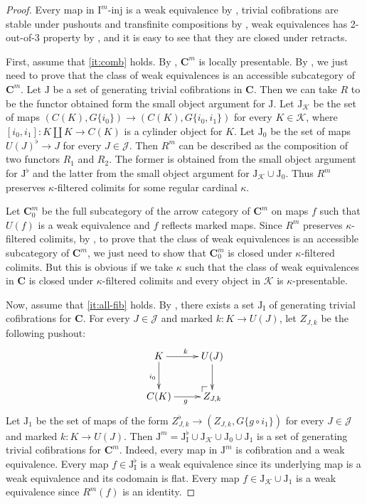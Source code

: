 \documentclass[reqno]{amsart}
\makeatletter
\theoremstyle{definition}
\theoremstyle{remark}
\newcommand{\cat}[1]{\mathbf{#1}}
\newcommand{\C}{\cat{C}}
\newcommand{\I}{\mathrm{I}}
\newcommand{\J}{\mathrm{J}}
\newcommand{\class}[2]{#1\text{-}\mathrm{#2}}
\newcommand{\Iinj}[1][\I]{\class{#1}{inj}}
\numberwithin{figure}{section}
\newcommand{\po}[1][dr]{\save*!/#1+1.2pc/#1:(1,-1)@^{|-}\restore}
\makeatother
\begin{document}
\begin{proof}
Every map in $\Iinj[\I^m]$ is a weak equivalence by ,
trivial cofibrations are stable under pushouts and transfinite compositions by ,
weak equivalences has 2-out-of-3 property by ,
and it is easy to see that they are closed under retracts.

First, assume that \eqref{it:comb} holds.
By , $\C^m$ is locally presentable.
By , we just need to prove that the class of weak equivalences is an accessible subcategory of $\C^m$.
Let $\J$ be a set of generating trivial cofibrations in $\C$.
Then we can take $R$ to be the functor obtained form the small object argument for $\J$.
Let $\J_\mathcal{K}$ be the set of maps $(C(K), G \{i_0\}) \to (C(K), G \{i_0,i_1\})$ for every $K \in \mathcal{K}$, where $[i_0,i_1] : K \amalg K \to C(K)$ is a cylinder object for $K$.
Let $\J_0$ be the set of maps $U(J)^\flat \to J$ for every $J \in \mathcal{J}$.
Then $R^m$ can be described as the composition of two functors $R_1$ and $R_2$.
The former is obtained from the small object argument for $\J^\flat$ and the latter from the small object argument for $\J_\mathcal{K} \cup \J_0$.
Thus $R^m$ preserves $\kappa$-filtered colimits for some regular cardinal $\kappa$.

Let $\C^m_0$ be the full subcategory of the arrow category of $\C^m$ on maps $f$ such that $U(f)$ is a weak equivalence and $f$ reflects marked maps.
Since $R^m$ preserves $\kappa$-filtered colimits, by \cite[Corollary~A.2.6.5]{lurie-topos},
to prove that the class of weak equivalences is an accessible subcategory of $\C^m$,
we just need to show that $\C^m_0$ is closed under $\kappa$-filtered colimits.
But this is obvious if we take $\kappa$ such that the class of weak equivalences in $\C$
is closed under $\kappa$-filtered colimits and every object in $\mathcal{K}$ is $\kappa$-presentable.

Now, assume that \eqref{it:all-fib} holds.
By \cite[Corollary~3.2]{f-model-structures}, there exists a set $\J_\I$ of generating trivial cofibrations for $\C$.
For every $J \in \mathcal{J}$ and marked $k : K \to U(J)$, let $Z_{J,k}$ be the following pushout:
\[ \xymatrix{ K \ar[r]^k \ar[d]_{i_0} & U(J) \ar[d] \\
              C(K) \ar[r]_g & \po Z_{J,k}
            } \]
Let $\J_1$ be the set of maps of the form $Z_{J,k}^\flat \to (Z_{J,k}, G\{ g \circ i_1 \})$ for every $J \in \mathcal{J}$ and marked $k : K \to U(J)$.
Then $\J^m = \J_\I^\flat \cup \J_\mathcal{K} \cup \J_0 \cup \J_1$ is a set of generating trivial cofibrations for $\C^m$.
Indeed, every map in $\J^m$ is cofibration and a weak equivalence.
Every map $f \in \J_\I^\flat$ is a weak equivalence since its underlying map is a weak equivalence and its codomain is flat.
Every map $f \in \J_\mathcal{K} \cup \J_1$ is a weak equivalence since $R^m(f)$ is an identity.


\end{proof}
\end{document}
